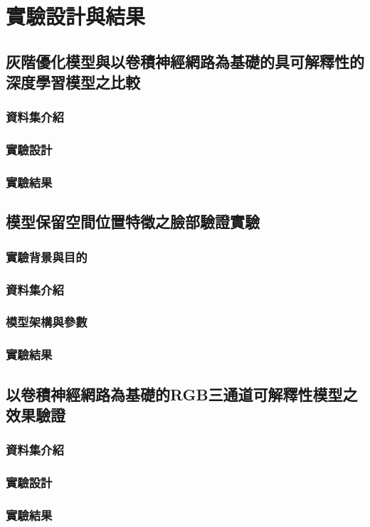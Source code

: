 \documentclass[class=NCU_thesis, crop=false]{standalone}
\begin{document}
\chapter{實驗設計與結果}
\section{灰階優化模型與以卷積神經網路為基礎的具可解釋性的深度學習模型之比較}
\subsection{資料集介紹}
\subsection{實驗設計}
\subsection{實驗結果}
\section{模型保留空間位置特徵之臉部驗證實驗}
\subsection{實驗背景與目的}
\subsection{資料集介紹}
\subsection{模型架構與參數}
\subsection{實驗結果}
\pagebreak
\section{以卷積神經網路為基礎的RGB三通道可解釋性模型之效果驗證}
\subsection{資料集介紹}
\subsection{實驗設計}
\subsection{實驗結果}
\end{document}
